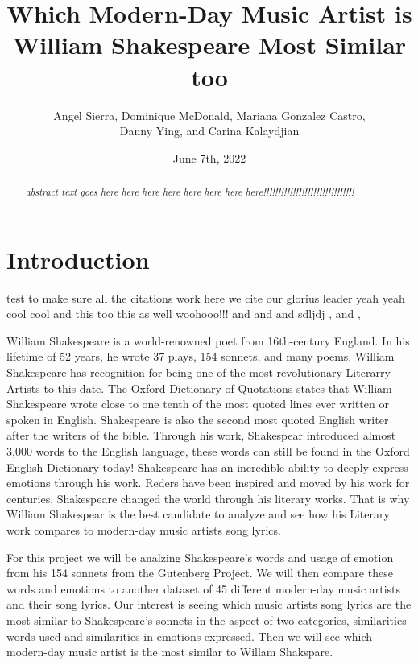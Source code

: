 \documentclass[11pt]{article}
\title {Which Modern-Day Music Artist is William Shakespeare Most Similar too\\[1ex]}
\author{
Angel Sierra, 
Dominique McDonald,
Mariana Gonzalez Castro, \\
Danny Ying,
and Carina Kalaydjian \\[1ex]
}
\date{June 7th, 2022}
\newcommand{\abstractinenglishname}{Abstract}
\newenvironment{abstractinenglish}{
        \def\abstractname{\abstractinenglishname}
	\begin{abstract}
}{
        \end{abstract}
}
\begin{document}
\maketitle
\vspace{6pt}

\begin{abstractinenglish}
\emph{abstract text goes here here here here here here here here!!!!!!!!!!!!!!!!!!!!!!!!!!!!!!!}
\end{abstractinenglish}

\section{Introduction}
test to make sure all the citations work 
here we cite \cite{web1} our glorius leader \cite{web2} yeah yeah cool cool \cite{briney2015data} and this too \cite{monkey} this as well \cite{sonnetsData} woohooo!!! \cite{musicData} and \cite{syuzhet} and \cite{tm} and \cite{shakeFacts} sdljdj \cite{k-means} , \cite{NLP-for-music} and  \cite{NLP-for-lyrics}, \cite{knowledge-graphs}

William Shakespeare is a world-renowned poet from 16th-century England. In his lifetime of 52 years, he wrote 37 plays, 154 sonnets, and many poems\cite{shakeFacts}. William Shakespeare has recognition for being one of the most revolutionary Literarry Artists to this date\cite{shakeFacts}. The Oxford Dictionary of Quotations states that William Shakespeare wrote close to one tenth of the most quoted lines ever written or spoken in English\cite{shakeFacts}. Shakespeare is also the second most quoted English writer after the writers of the bible\cite{shakeFacts}. Through his work, Shakespear introduced almost  3,000 words to the English language, these words can still be found in the Oxford English Dictionary today\cite{shakeFacts}! Shakespeare has an incredible ability to deeply express emotions through his work. Reders have been inspired and moved by his work for centuries. Shakespeare changed the world through his literary works. That is why William Shakespear is the best candidate to analyze and see how his Literary work compares to modern-day music artists song lyrics. 

For this project we will be analzing Shakespeare's words and usage of emotion from his 154 sonnets from the Gutenberg Project\cite{sonnetsData}. We will then compare these words and emotions to another dataset of 45 different modern-day music artists and their song lyrics\cite{musicData}. Our interest is seeing which music artists song lyrics are the most similar to Shakespeare's sonnets in the aspect of two categories, similarities words used and similarities in emotions expressed. Then we will see which modern-day music artist is the most similar to Willam Shakspare.  
\end{document}
